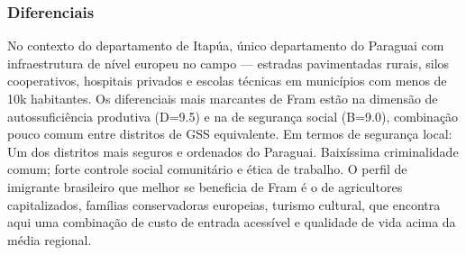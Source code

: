 \subsubsection*{Diferenciais}\label{dif-fram-0711}
No contexto do departamento de Itapúa, único departamento do Paraguai com infraestrutura de nível europeu no campo — estradas pavimentadas rurais, silos cooperativos, hospitais privados e escolas técnicas em municípios com menos de 10k habitantes. Os diferenciais mais marcantes de Fram estão na dimensão de autossuficiência produtiva (D=9.5) e na de segurança social (B=9.0), combinação pouco comum entre distritos de GSS equivalente. Em termos de segurança local: Um dos distritos mais seguros e ordenados do Paraguai. Baixíssima criminalidade comum; forte controle social comunitário e ética de trabalho. O perfil de imigrante brasileiro que melhor se beneficia de Fram é o de agricultores capitalizados, famílias conservadoras europeias, turismo cultural, que encontra aqui uma combinação de custo de entrada acessível e qualidade de vida acima da média regional.
